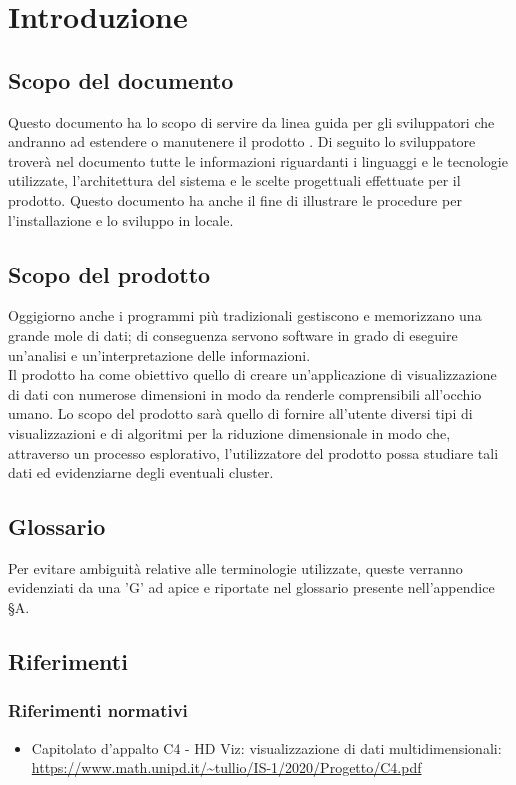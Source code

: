 \section{Introduzione}
\subsection{Scopo del documento}
Questo documento ha lo scopo di servire da linea guida per gli sviluppatori che andranno ad estendere o manutenere il prodotto \NomeProgetto{}. Di seguito lo sviluppatore troverà nel documento tutte le informazioni riguardanti i linguaggi e le tecnologie utilizzate, l'architettura del sistema e le scelte progettuali effettuate per il prodotto. Questo documento ha anche il fine di illustrare le procedure per l'installazione e lo sviluppo in locale.

\subsection{Scopo del prodotto}
Oggigiorno anche i programmi più tradizionali gestiscono e memorizzano una grande mole di dati; di conseguenza servono software in grado di eseguire un'analisi e un'interpretazione delle informazioni.\\
Il prodotto \NomeProgetto{} ha come obiettivo quello di creare un'applicazione di visualizzazione di dati con numerose dimensioni in modo da renderle comprensibili all'occhio umano.  Lo scopo del prodotto sarà quello di fornire all'utente diversi tipi di visualizzazioni e di algoritmi per la riduzione dimensionale in modo che, attraverso un processo esplorativo, l'utilizzatore del prodotto possa studiare tali dati ed evidenziarne degli eventuali cluster. 

\subsection{Glossario}
Per evitare ambiguità relative alle terminologie utilizzate, queste verranno evidenziati da una 'G' ad apice e riportate nel glossario presente nell'appendice \S A.

\subsection{Riferimenti}
\subsubsection{Riferimenti normativi}
\begin{itemize}
	\item	Capitolato d'appalto C4 - HD Viz: visualizzazione di dati multidimensionali: \\
	\textcolor{blue}{\url{https://www.math.unipd.it/~tullio/IS-1/2020/Progetto/C4.pdf}}
\end{itemize}


